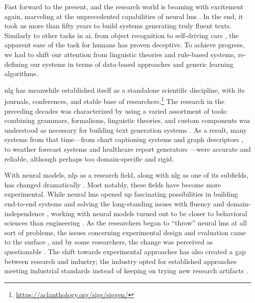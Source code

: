 Fast forward to the present, and the research world is beaming with excitement again, marveling at the unprecedented capabilities of neural \acp{lm} \cite{radford2019language,brown2020language}. In the end, it took us more than fifty years to build systems generating truly fluent texts. Similarly to other tasks in \ac{ai}, from object recognition \cite{papert1966summer} to self-driving cars \cite{autonomouscars}, the apparent ease of the task for humans has proven deceptive.  To achieve progress, we had to shift our attention from linguistic theories and rule-based systems, re-defining our systems in terms of data-based approaches and generic learning algorithms.

\Ac{nlg} has meanwhile established itself as a standalone scientific discipline, with its journals, conferences, and stable base of researchers.\footnote{\url{https://aclanthology.org/sigs/siggen/}} The research in the preceding decades was characterized by using a varied assortment of tools: combining grammars, formalisms, linguistic theories, and custom components was understood as necessary for building text generation systems \cite{mann-1982-text,reiterBuildingAppliedNatural1997}. As a result, many systems from that time---from chart captioning systems \cite{mittalDescribingComplexCharts1998} and graph descriptors \cite{sunDomainIndependentSentence2006}, to weather forecast systems \cite{belzAutomaticGenerationWeather2008} and healthcare report generators \cite{portetAutomaticGenerationTextual2009}---were accurate and reliable, although perhaps too domain-specific and rigid.


With neural models, \ac{nlp} as a research field, along with \ac{nlg} as one of its subfields, has changed dramatically \cite{gururaja2023build,li2023defining}. Most notably, these fields have become more experimental. While neural \acp{lm} opened up fascinating possibilities in building end-to-end systems and solving the long-standing issues with fluency and domain-independence \cite{ferreiraNeuralDatatotextGeneration2019,dusekEvaluatingStateoftheartEndtoEnd2020,sharmaInnovationsNeuralDatatotext2022}, working with neural models turned out to be closer to behavioral sciences than engineering \cite{holtzmanGenerativeModelsComplex2023}. As the researchers began to ``throw'' neural \acp{lm} at all sort of problems, the issues concerning experimental design and evaluation came to the surface \cite{gehrmannRepairingCrackedFoundation2022}, and by some researchers, the change was perceived as questionable \cite{reiter2020academic,gururaja2023build,michael2023nlp}. The shift towards experimental approaches has also created a gap between research and industry; the industry opted for established approaches meeting industrial standards instead of keeping on trying new research artifacts \cite{daleNaturalLanguageGeneration2020,daleNavigatingTextGeneration2023}.


